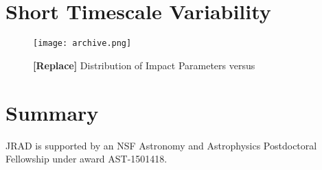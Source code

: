 \documentclass[twocolumn]{aastex6}
\begin{document}
\section{Short Timescale Variability}
\label{sec:short}


\begin{figure}[!t]
\centering
\texttt{[image: archive.png]}
\caption{{\bf [Replace]} Distribution of Impact Parameters versus }
\label{fig:medtime}
\end{figure}





\section{Summary}
\label{sec:summary}


\acknowledgments

JRAD is supported by an NSF Astronomy and Astrophysics Postdoctoral Fellowship under award AST-1501418. 



\end{document}
